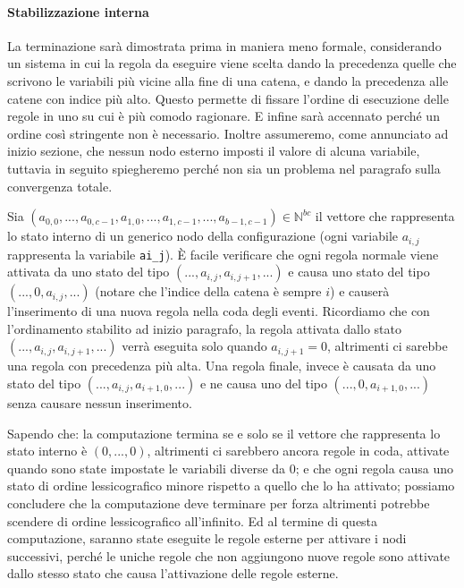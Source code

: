 \documentclass[12pt, a4paper]{article}
\begin{document}
\paragraph{Stabilizzazione interna}

La terminazione sarà dimostrata prima in maniera meno formale, considerando un sistema in cui la regola da eseguire viene scelta dando la precedenza quelle che scrivono le variabili più vicine alla fine di una catena, e dando la precedenza alle catene con indice più alto. Questo permette di fissare l'ordine di esecuzione delle regole in uno su cui è più comodo ragionare. E infine sarà accennato perché un ordine così stringente non è necessario.
Inoltre assumeremo, come annunciato ad inizio sezione, che nessun nodo esterno imposti il valore di alcuna variabile, tuttavia in seguito spiegheremo perché non sia un problema nel paragrafo sulla convergenza totale.

Sia $(a_{0,0},...,a_{0,c-1},a_{1,0},...,a_{1,c-1},...,a_{b-1,c-1})\in \mathbb{N}^{bc}$ il vettore che rappresenta lo stato interno di un generico nodo della configurazione (ogni variabile $a_{i,j}$ rappresenta la variabile \lstinline{ai_j}). È facile verificare che ogni regola normale viene attivata da uno stato del tipo $(...,a_{i,j},a_{i,j+1},...)$ e causa uno stato del tipo $(...,0,a_{i,j},...)$ (notare che l'indice della catena è sempre $i$) e causerà l'inserimento di una nuova regola nella coda degli eventi.
Ricordiamo che con l'ordinamento stabilito ad inizio paragrafo, la regola attivata dallo stato $(...,a_{i,j},a_{i,j+1},...)$ verrà eseguita solo quando $a_{i,j+1}=0$, altrimenti ci sarebbe una regola con precedenza più alta.
Una regola finale, invece è causata da uno stato del tipo $(...,a_{i,j},a_{i+1,0},...)$ e ne causa uno del tipo $(...,0,a_{i+1,0},...)$ senza causare nessun inserimento.

Sapendo che: la computazione termina se e solo se il vettore che rappresenta lo stato interno è $(0,...,0)$, altrimenti ci sarebbero ancora regole in coda, attivate quando sono state impostate le variabili diverse da $0$; e che ogni regola causa uno stato di ordine lessicografico minore rispetto a quello che lo ha attivato; possiamo concludere che la computazione deve terminare per forza altrimenti potrebbe scendere di ordine lessicografico all'infinito.
Ed al termine di questa computazione, saranno state eseguite le regole esterne per attivare i nodi successivi, perché le uniche regole che non aggiungono nuove regole sono attivate dallo stesso stato che causa l'attivazione delle regole esterne.
\end{document}
